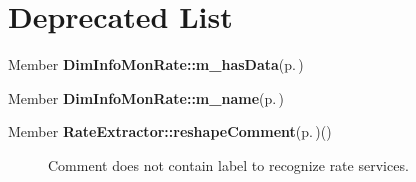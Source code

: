 \section{Deprecated List}\label{deprecated}
\label{deprecated__deprecated000001}
 \begin{description}
\item[Member {\bf Dim\-Info\-Mon\-Rate::m\_\-has\-Data}{\rm (p.\,\pageref{classDimInfoMonRate_r1})} ]\end{description}


\label{deprecated__deprecated000002}
 \begin{description}
\item[Member {\bf Dim\-Info\-Mon\-Rate::m\_\-name}{\rm (p.\,\pageref{classDimInfoMonRate_r2})} ]\end{description}


\label{deprecated__deprecated000003}
 \begin{description}
\item[Member {\bf Rate\-Extractor::reshape\-Comment}{\rm (p.\,\pageref{classRateExtractor_d1})}() ]Comment does not contain label to recognize rate services. \end{description}
